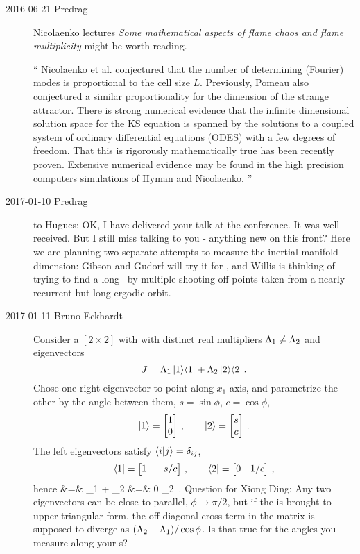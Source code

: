 \begin{description}
\item[2016-06-21 Predrag]
Nicolaenko lectures
{\em Some mathematical aspects of flame chaos and flame multiplicity}
might be worth reading.

``
Nicolaenko et al. conjectured that the number of determining
(Fourier) modes is proportional to the cell size $L$. Previously, Pomeau
\etal{} also conjectured a similar proportionality for the
dimension of the strange attractor. There is strong numerical evidence that
the infinite dimensional solution space for the KS equation is spanned by the
solutions to a coupled system of ordinary differential equations (ODES) with
a few degrees of freedom. That this is rigorously mathematically true has
been recently proven. Extensive numerical
evidence may be found in the high precision computers simulations of Hyman
and Nicolaenko.
''
\item[2017-01-10 Predrag] to Hugues:
OK, I have delivered
 {your
talk} at the conference. It was well received. But I still miss talking
to you - anything new on this front? Here we are planning two separate
attempts to measure the inertial manifold dimension: Gibson and Gudorf
will try it for \pCf, and Willis is thinking of trying to find a long
\rpo\ by multiple shooting off points taken from a nearly recurrent but
long ergodic orbit.

\item[2017-01-11 Bruno Eckhardt] Consider a $[2\!\times\!2]$ {\jacobianM}
with with distinct real multipliers $\Lambda_1\neq\Lambda_2$ and eigenvectors
\[
\jMps = \ExpaEig_1\,\ket{1}\bra{1} + \ExpaEig_2\,\ket{2}\bra{2}
\,.
\]
Chose one right eigenvector to point along $x_1$ axis, and parametrize the
other by the angle between them, $s=\sin \phi$,  $c=\cos \phi$,
\[
\ket{1} = \VectorII{1}{0} \,, \qquad
\ket{2} = \VectorII{s}{c}
\,.
\]
The left eigenvectors satisfy $\braket{i}{j} = \delta_{ij}$,
\[
\bra{1} = \transpVectorII{1}{-s/c} \,, \qquad
\bra{2} = \transpVectorII{0}{1/c}
\,,
\]
hence
\bea
\jMps &=& \ExpaEig_1 
        + \ExpaEig_2 
      \continue
      &=& 
                   {0}         {\ExpaEig_2}
\,.
\label{BEjacobian}
\eea
Question for Xiong Ding:
Any two eigenvectors can be close to parallel, $\phi\to\pi/2$, but if the
{\jacobianM} is brought to upper triangular form, the off-diagonal cross
term in the matrix is supposed to diverge as
$(\Lambda_2-\Lambda_1)/\cos \phi$. Is that true for the angles you
measure along your \po s?


\end{description}
